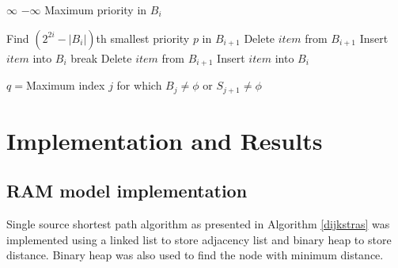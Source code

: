 \documentclass[final,3p]{CSP}
\begin{document}
    \begin{algorithm}
        \caption{}\label{maxPriority}
        \begin{algorithmic}[1]
             
            \State \Return $\infty$
            \EndIf
               
            \State \Return $-\infty$
            \Else
            \State Maximum priority in $B_i$
            \EndIf
        \end{algorithmic}
    \end{algorithm}


    \begin{algorithm}
        \caption{}\label{fillBucket}
        \begin{algorithmic}[1]
            \State {}
                    
            \State {}
            \EndIf

                  
            \State {}
            \EndIf

            \State Find $(2^{2i} - |B_i|)$th smallest priority $p$ in $B_{i+1}$
            \State Delete $item$ from $B_{i+1}$
            \State Insert $item$ into $B_i$
            \EndIf
            \EndFor
            \State break
            \EndIf
            \State Delete $item$ from $B_{i+1}$
            \State Insert $item$ into $B_i$
            \EndIf
            \EndFor

            \State $q = $Maximum index $j$ for which $B_j \neq \phi$ or $S_{j+1} \neq \phi$
        \end{algorithmic}
    \end{algorithm}

    \section{Implementation and Results}
    \subsection{RAM model implementation}
    Single source shortest path algorithm as presented in Algorithm \ref{dijkstras} was implemented using a linked list to store adjacency list and binary heap to store distance. Binary heap was also used to find the node with minimum distance.
\end{document}
